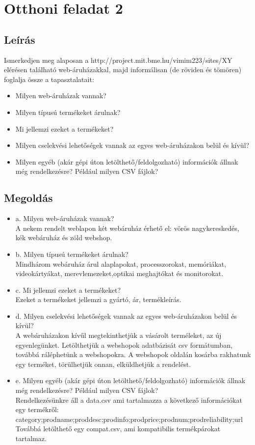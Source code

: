 \section{Otthoni feladat 2}
\subsection{Leírás}
Ismerkedjen meg alaposan a http://project.mit.bme.hu/vimim223/sites/XY elérésen található web-áruházakkal, majd informálisan (de röviden és tömören) foglalja össze a tapasztalatait:
\begin{itemize}
\item Milyen web-áruházak vannak? 
\item Milyen típusú termékeket árulnak? 
\item Mi jellemzi ezeket a termékeket? 
\item Milyen cselekvési lehetőségek vannak az egyes web-áruházakon belül és kívül? 
\item Milyen egyéb (akár gépi úton letölthető/feldolgozható) információk állnak még rendelkezésre? Például milyen CSV fájlok? 
\end{itemize}
\subsection{Megoldás}
\begin{itemize}
\item a. Milyen web-áruházak vannak? \\
A nekem rendelt weblapon két webáruház érhető el: vörös nagykereskedés, kék webáruház és zöld webshop. 
\item b. Milyen típusú termékeket árulnak? \\
Mindhárom webáruház árul alaplapokat, processzorokat, memóriákat, videokártyákat, merevlemezeket,optikai meghajtókat és monitorokat.
\item c. Mi jellemzi ezeket a termékeket? \\
Ezeket a termékeket jellemzi a gyártó, ár, termékleírás.
\item d. Milyen cselekvési lehetőségek vannak az egyes web-áruházakon belül és kívül? \\
A webáruházakon kívűl megtekinthetjük a vásárolt terméleket, az új egyenlegünket. Letölthetjük a webshopok adatbázisát csv formátumban, továbbá ráléphetünk a webshopokra.
A webshopok oldalán kosárba rakhatunk egy terméket, törülhetjük onnan, elküldhetjük a rendelést.
\item e. Milyen egyéb (akár gépi úton letölthető/feldolgozható) információk állnak még rendelkezésre? Például milyen CSV fájlok? \\
Rendelkezésünkre áll a data.csv ami tartalmazza a következő információkat egy termékről: category;prodname;proddesc;prodinfo;prodprice;prodnum;prodreliability;url
Továbbá letölthető egy compat.csv, ami kompatibilis termékpárokat tartalmaz.
\end{itemize}

